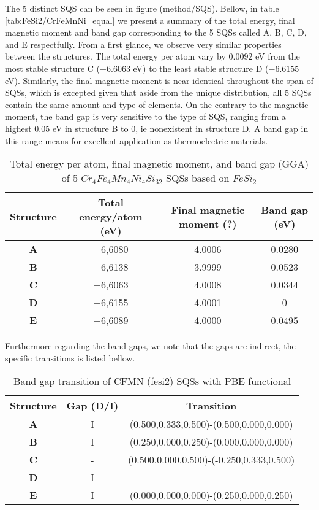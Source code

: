 The 5 distinct SQS can be seen in figure (method/SQS). Bellow, in table \ref{tab:FeSi2/CrFeMnNi_equal} we present a summary of the total energy, final magnetic moment and band gap corresponding to the 5 SQSs called A, B, C, D, and E respectfully. From a first glance, we observe very similar properties between the structures. The total energy per atom vary by $0.0092$ eV from the most stable structure C ($-6.6063$ eV) to the least stable structure D ($-6.6155$ eV). Similarly, the final magnetic moment is near identical throughout the span of SQSs, which is excepted given that aside from the unique distribution, all 5 SQSs contain the same amount and type of elements. On the contrary to the magnetic moment, the band gap is very sensitive to the type of SQS, ranging from a highest $0.05$ eV in structure B to $0$, ie nonexistent in structure D. A band gap in this range means for excellent application as thermoelectric materials. 


\begin{table}[H]
\centering
\begin{tabular}{@{}cccc@{}}
\toprule
Structure  & Total energy/atom (eV) & Final magnetic moment (?) & Band gap (eV) \\ \midrule
\textbf{A} & −6,6080                & 4.0006                    & 0.0280        \\
\textbf{B} & −6,6138                & 3.9999                    & 0.0523        \\
\textbf{C} & −6,6063                & 4.0008                    & 0.0344        \\
\textbf{D} & −6,6155                & 4.0001                    & 0             \\
\textbf{E} & −6,6089                & 4.0000                    & 0.0495        \\ \bottomrule
\end{tabular}
\caption{Total energy per atom, final magnetic moment, and band gap (GGA) of 5 $Cr_4Fe_4Mn_4Ni_4Si_{32}$ SQSs based on $FeSi_2$}
\label{table:fesi2_summary}
\end{table}  
Furthermore regarding the band gaps, we note that the gaps are indirect, the specific transitions is listed bellow.

\begin{table}[H]
\centering
\begin{tabular}{@{}ccc@{}}
\toprule
Structure  & Gap (D/I) & Transition                              \\ \midrule
\textbf{A} & I         & (0.500,0.333,0.500)-(0.500,0.000,0.000)  \\
\textbf{B} & I         & (0.250,0.000,0.250)-(0.000,0.000,0.000)  \\
\textbf{C} & -         & (0.500,0.000,0.500)-(-0.250,0.333,0.500) \\
\textbf{D} & I         & -                                        \\
\textbf{E} & I         & (0.000,0.000,0.000)-(0.250,0.000,0.250)  \\ \bottomrule
\end{tabular}
\caption{Band gap transition of CFMN (fesi2) SQSs with PBE functional}
\end{table}

